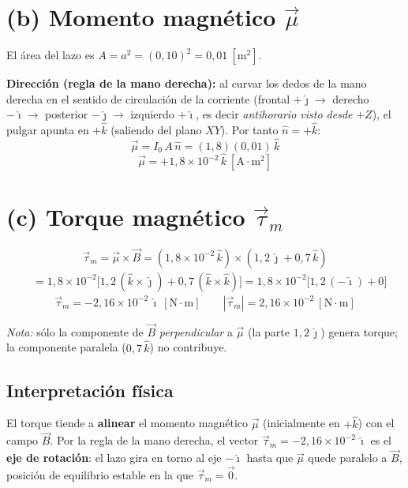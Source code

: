 \documentclass[12pt,letterpaper]{article}
\begin{document}
\section*{(b) Momento magn\'etico $\vec{\mu}$}

El \'area del lazo es $A=a^2=(0{,}10)^2=0{,}01\ [\text{m}^2]$.

\medskip
\noindent\textbf{Direcci\'on (regla de la mano derecha):} al curvar los dedos de la mano derecha
en el sentido de circulaci\'on de la corriente (frontal $+\hat{\jmath}\to$ derecho $-\hat{\imath}
\to$ posterior $-\hat{\jmath}\to$ izquierdo $+\hat{\imath}$, es decir \emph{antihorario visto
desde} $+Z$), el pulgar apunta en $+\hat{k}$ (saliendo del plano $XY$). Por tanto $\hat{n}=+\hat{k}$:
\[
    \vec{\mu} = I_0\,A\,\hat{n} = (1{,}8)(0{,}01)\,\hat{k}
\]
\[
    \boxed{\vec{\mu} = +1{,}8\times10^{-2}\,\hat{k}\ [\text{A}\cdot\text{m}^2]}
\]

\section*{(c) Torque magn\'etico $\vec{\tau}_m$}

\[
    \vec{\tau}_m = \vec{\mu}\times\vec{B}
       = (1{,}8\times10^{-2}\,\hat{k})\times(1{,}2\,\hat{\jmath}+0{,}7\,\hat{k})
\]
\begin{align*}
    &= 1{,}8\times10^{-2}\big[1{,}2\,(\hat{k}\times\hat{\jmath})+0{,}7\,(\hat{k}\times\hat{k})\big]
     = 1{,}8\times10^{-2}\big[1{,}2\,(-\hat{\imath})+0\big]
\end{align*}
\[
    \boxed{\vec{\tau}_m = -2{,}16\times10^{-2}\,\hat{\imath}\ [\text{N}\cdot\text{m}]}
    \qquad |\vec{\tau}_m| = 2{,}16\times10^{-2}\ [\text{N}\cdot\text{m}]
\]

\noindent\textit{Nota:} s\'olo la componente de $\vec{B}$ \emph{perpendicular} a $\vec{\mu}$
(la parte $1{,}2\,\hat{\jmath}$) genera torque; la componente paralela ($0{,}7\,\hat{k}$) no
contribuye.

\subsection*{Interpretaci\'on f\'isica}

El torque tiende a \textbf{alinear} el momento magn\'etico $\vec{\mu}$ (inicialmente en $+\hat{k}$)
con el campo $\vec{B}$. Por la regla de la mano derecha, el vector $\vec{\tau}_m=-2{,}16\times
10^{-2}\,\hat{\imath}$ es el \textbf{eje de rotaci\'on}: el lazo gira en torno al eje $-\hat{\imath}$
hasta que $\vec{\mu}$ quede paralelo a $\vec{B}$, posici\'on de equilibrio estable en la que
$\vec{\tau}_m=\vec{0}$.
\end{document}
